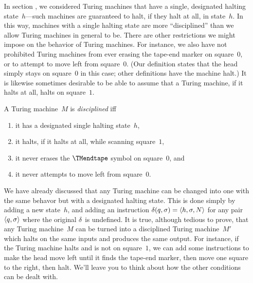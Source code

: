 \documentclass[../../../include/open-logic-section]{subfiles}
\begin{document}

\begin{explain}
In section , we considered Turing machines that have a
single, designated halting state~$h$---such machines are guaranteed to
halt, if they halt at all, in state~$h$.  In this way, machines with a
single halting state are more ``disciplined'' than we allow Turing
machines in general to be.  There are other restrictions we might
impose on the behavior of Turing machines.  For instance, we also have
not prohibited Turing machines from ever erasing the tape-end marker
on square~$0$, or to attempt to move left from square~$0$. (Our
definition states that the head simply stays on square~$0$ in this
case; other definitions have the machine halt.) It is likewise
sometimes desirable to be able to assume that a Turing machine, if
it halts at all, halts on square~$1$.
\end{explain}

\begin{defn}
A Turing machine~$M$ is \emph{disciplined} iff
\begin{enumerate}
    \item it has a designated single halting state~$h$,
    \item it halts, if it halts at all, while scanning square~$1$,
    \item it never erases the $\TMendtape$ symbol on square~$0$, and
    \item it never attempts to move left from square~$0$.
\end{enumerate}
\end{defn}

\begin{explain}
We have already discussed that any Turing machine can be changed into
one with the same behavor but with a designated halting state. This is
done simply by adding a new state~$h$, and adding an instruction
$\delta(q, \sigma) = \langle h, \sigma, N \rangle$ for any pair
$\langle q,\sigma \rangle$ where the original $\delta$~is undefined.  It is
true, although tedious to prove, that any Turing machine~$M$ can be
turned into a disciplined Turing machine~$M'$ which halts on the same
inputs and produces the same output. For instance, if the Turing
machine halts and is not on square~$1$, we can add some instructions
to make the head move left until it finds the tape-end marker, then
move one square to the right, then halt.  We'll leave you to think
about how the other conditions can be dealt with.
\end{explain}
\end{document}
